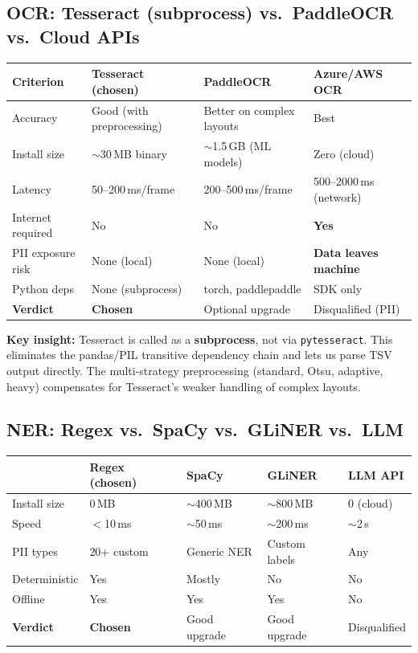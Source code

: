 \documentclass[12pt, a4paper]{article}
\newcommand{\codeinline}[1]{\texttt{\small\colorbox{codebg}{#1}}}
\begin{document}
\subsection{OCR: Tesseract (subprocess) vs.\ PaddleOCR vs.\ Cloud APIs}

\begin{longtable}{@{} p{3.5cm} p{3.5cm} p{3.5cm} p{3.5cm} @{}}
    \toprule
    \textbf{Criterion} & \textbf{Tesseract (chosen)} & \textbf{PaddleOCR} & \textbf{Azure/AWS OCR} \\
    \midrule
    Accuracy & Good (with preprocessing) & Better on complex layouts & Best \\
    Install size & $\sim$30\,MB binary & $\sim$1.5\,GB (ML models) & Zero (cloud) \\
    Latency & 50--200\,ms/frame & 200--500\,ms/frame & 500--2000\,ms (network) \\
    Internet required & No & No & \textcolor{rejectred}{\textbf{Yes}} \\
    PII exposure risk & None (local) & None (local) & \textcolor{rejectred}{\textbf{Data leaves machine}} \\
    Python deps & None (subprocess) & torch, paddlepaddle & SDK only \\
    \midrule
    \textbf{Verdict} & \textcolor{acceptgreen}{\textbf{Chosen}} & Optional upgrade & Disqualified (PII) \\
    \bottomrule
\end{longtable}

\textbf{Key insight:} Tesseract is called as a \textbf{subprocess}, not via \codeinline{pytesseract}. This eliminates the pandas/PIL transitive dependency chain and lets us parse TSV output directly. The multi-strategy preprocessing (standard, Otsu, adaptive, heavy) compensates for Tesseract's weaker handling of complex layouts.

\subsection{NER: Regex vs.\ SpaCy vs.\ GLiNER vs.\ LLM}

\begin{longtable}{@{} p{3cm} p{3cm} p{3cm} p{3cm} p{2cm} @{}}
    \toprule
    & \textbf{Regex (chosen)} & \textbf{SpaCy} & \textbf{GLiNER} & \textbf{LLM API} \\
    \midrule
    Install size & 0\,MB & $\sim$400\,MB & $\sim$800\,MB & 0 (cloud) \\
    Speed & $<$10\,ms & $\sim$50\,ms & $\sim$200\,ms & $\sim$2\,s \\
    PII types & 20+ custom & Generic NER & Custom labels & Any \\
    Deterministic & Yes & Mostly & No & No \\
    Offline & Yes & Yes & Yes & No \\
    \midrule
    \textbf{Verdict} & \textcolor{acceptgreen}{\textbf{Chosen}} & Good upgrade & Good upgrade & Disqualified \\
    \bottomrule
\end{longtable}
\end{document}

